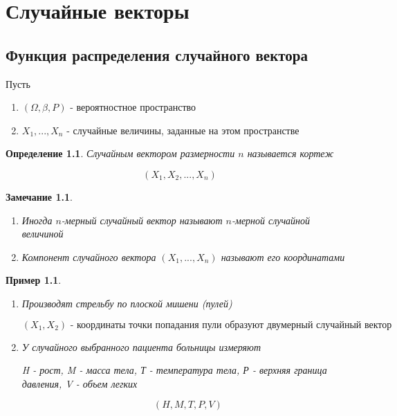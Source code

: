 \documentclass[a4paper, 14pt]{report}
\newtheorem{defenition}{Определение}[section]
\newtheorem{note}{Замечание}[section]
\newtheorem{example}{Пример}[section]
\begin{document}
\chapter{Случайные векторы}

\section{Функция распределения случайного вектора}

Пусть

\begin{enumerate}
    \item $(\Omega, \beta, P)$ - вероятностное пространство
    \item $X_1, ..., X_n$ - случайные величины, заданные на этом пространстве
\end{enumerate}

\begin{defenition}
    Случайным вектором размерности $n$ называется кортеж

    $$
    (X_1, X_2,..., X_n)
    $$
\end{defenition}

\begin{note}
    \begin{enumerate}
        \item Иногда $n$-мерный случайный вектор называют $n$-мерной случайной величиной
        \item Компонент случайного вектора $(X_1,...,X_n)$ называют его координатами
    \end{enumerate}
\end{note}

\begin{example}

    \hfill

    \begin{enumerate}
        \item Производят стрельбу по плоской мишени (пулей)

            $$
            (X_1, X_2) \text{ - координаты точки попадания пули образуют двумерный случайный вектор}
            $$

        \item У случайного выбранного пациента больницы измеряют

            H - рост, M - масса тела, Т - температура тела, Р - верхняя граница давления, V - объем легких

            $$
            (H,M,T,P,V)
            $$
    \end{enumerate}
\end{example}
\end{document}
